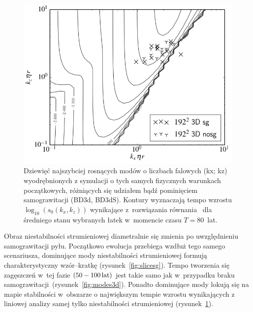 %
\begin{figure}[h]
   \centering
   \includegraphics[width=0.5\linewidth]{figures/3d_map_x3_50.png}
   \caption[Ewolucja najszybciej rosnących modów niestabilności strumieniowej w
            symulacjach BD3d i BD3dS.]
     {Dziewięć najszybciej rosnących modów o liczbach falowych (kx; kz)
      wyodrębnionych z symulacji o tych samych fizycznych warunkach
      początkowych, różniących się udziałem bądź pominięciem
      samograwitacji (BD3d, BD3dS).  Kontury wyznaczają tempo wzrostu
      $\log_{10}(s_0(k_x, k_z))$ wynikające z~rozwiązania równania~
       dla średniego stanu wybranych łatek w~momencie
      czasu $T = 80$~lat.}
   \label{fig:map3d}
\end{figure}
Obraz niestabilności strumieniowej diametralnie się zmienia po
uwzględnieniu samograwitacji pyłu. Początkowo ewolucja przebiega wzdłuż tego
samego scenariusza, dominujące mody niestabilności strumieniowej formują
charakterystyczny wzór--kratkę (rysunek~\ref{fig:slicesg}). Tempo tworzenia się
zagęszczeń w~tej fazie $(50 - 100\hbox{$\thinspace\textrm{lat}$})$ jest takie samo jak w~przypadku braku
samograwitacji~(rysunek~\ref{fig:modes3d}). Ponadto dominujące mody lokują się
na mapie stabilności w~obszarze o największym tempie wzrostu wynikających z
liniowej analizy samej tylko niestabilności strumieniowej 
(rysunek~\ref{fig:map3d}).
%
